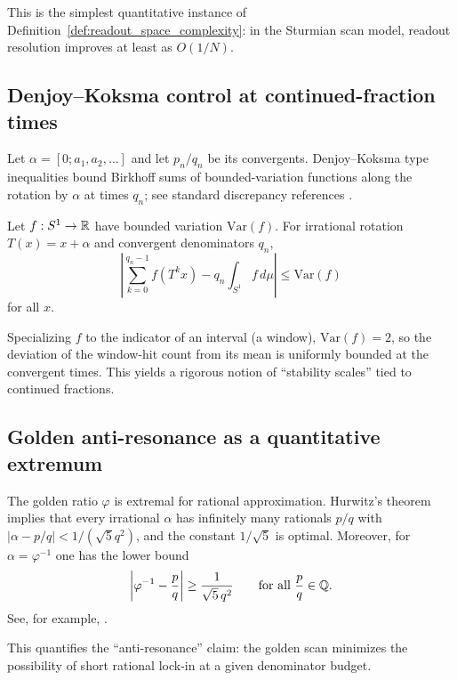This is the simplest quantitative instance of Definition~\ref{def:readout_space_complexity}: in the Sturmian scan model, readout resolution improves at least as $O(1/N)$.

\subsection{Denjoy--Koksma control at continued-fraction times}
Let $\alpha=[0;a_1,a_2,\dots]$ and let $p_n/q_n$ be its convergents.
Denjoy--Koksma type inequalities bound Birkhoff sums of bounded-variation functions along the rotation by $\alpha$ at times $q_n$; see standard discrepancy references \cite{KuipersNiederreiter1974}.

\begin{theorem}
\label{thm:denjoy_koksma}
Let $f:S^1\to\mathbb{R}$ have bounded variation $\mathrm{Var}(f)$. For irrational rotation $T(x)=x+\alpha$ and convergent denominators $q_n$,
\begin{equation}
\left|\sum_{k=0}^{q_n-1} f(T^k x) - q_n\int_{S^1} f\,d\mu\right|\le \mathrm{Var}(f)
\end{equation}
for all $x$.
\end{theorem}

Specializing $f$ to the indicator of an interval (a window), $\mathrm{Var}(f)=2$, so the deviation of the window-hit count from its mean is uniformly bounded at the convergent times.
This yields a rigorous notion of ``stability scales'' tied to continued fractions.

\subsection{Golden anti-resonance as a quantitative extremum}
The golden ratio $\varphi$ is extremal for rational approximation.
Hurwitz's theorem implies that every irrational $\alpha$ has infinitely many rationals $p/q$ with $|\alpha-p/q|<1/(\sqrt{5}q^2)$, and the constant $1/\sqrt{5}$ is optimal.
Moreover, for $\alpha=\varphi^{-1}$ one has the lower bound
\begin{equation}
\left|\varphi^{-1}-\frac{p}{q}\right|\ge \frac{1}{\sqrt{5}\,q^2}
\qquad \text{for all }\frac{p}{q}\in\mathbb{Q}.
\label{eq:golden_worst_approx}
\end{equation}
See, for example, \cite[Ch.~II]{Cassels1957}.

This quantifies the ``anti-resonance'' claim: the golden scan minimizes the possibility of short rational lock-in at a given denominator budget.

